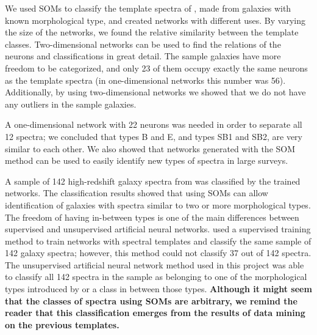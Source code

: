 \documentclass[useAMS,usenatbib]{mn2e}
\begin{document}
    We used SOMs to classify the template spectra of , made from galaxies with known morphological type, and created networks with different uses.
    By varying the size of the networks, we found the relative similarity between the  template classes.
    Two-dimensional networks can be used to find the relations of the neurons and classifications in great detail.
    The sample galaxies have more freedom to be categorized, and only 23 of them occupy exactly the same neurons as the  template spectra (in one-dimensional networks this number was 56).
    Additionally, by using two-dimensional networks we showed that we do not have any outliers in the sample galaxies.

    A one-dimensional network with 22 neurons was needed in order to
    separate all 12  spectra; we concluded that  types B and E, and types SB1 and SB2, are very similar to each other.
    We also showed that networks generated with the SOM method can be used to easily identify new types of spectra in large surveys.

    A sample of 142 high-redshift galaxy spectra from  was classified by the trained networks.
    The classification results showed that using SOMs can allow identification of galaxies with spectra similar to two or more morphological types.
    The freedom of having in-between types is one of the main differences between supervised and unsupervised artificial neural networks.
     used a supervised training method to train networks with  spectral templates and classify the same sample of 142 galaxy spectra;
    however, this method could not classify 37 out of 142 spectra.
    The unsupervised artificial neural network method used in this project was able to classify  all 142 spectra in the sample
    as belonging to one of the morphological types introduced by  or a class in between those types.
    \textbf{Although it might seem that the classes of spectra using SOMs are arbitrary, we remind the reader that this classification emerges from the results of data mining on the previous templates.}
\end{document}
